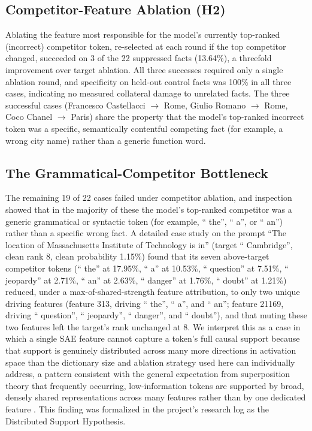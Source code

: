 \documentclass[conference]{IEEEtran}
\begin{document}
\subsection{Competitor-Feature Ablation (H2)}

Ablating the feature most responsible for the model's currently top-ranked (incorrect) competitor token, re-selected at each round if the top competitor changed, succeeded on 3 of the 22 suppressed facts (13.64\%), a threefold improvement over target ablation. All three successes required only a single ablation round, and specificity on held-out control facts was 100\% in all three cases, indicating no measured collateral damage to unrelated facts. The three successful cases (Francesco Castellacci $\rightarrow$ Rome, Giulio Romano $\rightarrow$ Rome, Coco Chanel $\rightarrow$ Paris) share the property that the model's top-ranked incorrect token was a specific, semantically contentful competing fact (for example, a wrong city name) rather than a generic function word.

\subsection{The Grammatical-Competitor Bottleneck}

The remaining 19 of 22 cases failed under competitor ablation, and inspection showed that in the majority of these the model's top-ranked competitor was a generic grammatical or syntactic token (for example, `` the'', `` a'', or `` an'') rather than a specific wrong fact. A detailed case study on the prompt ``The location of Massachusetts Institute of Technology is in'' (target `` Cambridge'', clean rank 8, clean probability 1.15\%) found that its seven above-target competitor tokens (`` the'' at 17.95\%, `` a'' at 10.53\%, `` question'' at 7.51\%, `` jeopardy'' at 2.71\%, `` an'' at 2.63\%, `` danger'' at 1.76\%, `` doubt'' at 1.21\%) reduced, under a max-of-shared-strength feature attribution, to only two unique driving features (feature 313, driving `` the'', `` a'', and `` an''; feature 21169, driving `` question'', `` jeopardy'', `` danger'', and `` doubt''), and that muting these two features left the target's rank unchanged at 8. We interpret this as a case in which a single SAE feature cannot capture a token's full causal support because that support is genuinely distributed across many more directions in activation space than the dictionary size and ablation strategy used here can individually address, a pattern consistent with the general expectation from superposition theory that frequently occurring, low-information tokens are supported by broad, densely shared representations across many features rather than by one dedicated feature \cite{elhage2022superposition}. This finding was formalized in the project's research log as the Distributed Support Hypothesis.
\end{document}
